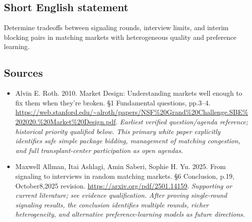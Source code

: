 \documentclass[11pt]{article}
\begin{document}
\subsection{Short English statement}
Determine tradeoffs between signaling rounds, interview limits, and interim blocking pairs in matching markets with heterogeneous quality and preference learning.

\subsection{Sources}
\begin{itemize}\raggedright
\item[\textnormal{[S1]}]\hypertarget{source:30007579:1}{} Alvin E. Roth. 2010. Market Design: Understanding markets well enough to fix them when they’re broken. §1 Fundamental questions, pp.3–4.
\url{https://web.stanford.edu/~alroth/papers/NSF%20Grand%20Challenge.SBE%202020.%20Market%20Design.pdf}.
{\small\textit{Earliest verified question/agenda reference; historical priority qualified below. This primary white paper explicitly identifies safe simple package bidding, management of matching congestion, and full transplant-center participation as open agendas.}}

\item[\textnormal{[S2]}]\hypertarget{source:30007579:2}{} Maxwell Allman, Itai Ashlagi, Amin Saberi, Sophie H. Yu. 2025. From signaling to interviews in random matching markets. §6 Conclusion, p.19, October8,2025 revision.
\url{https://arxiv.org/pdf/2501.14159}.
{\small\textit{Supporting or current literature; see evidence qualification. After proving single-round signaling results, the conclusion identifies multiple rounds, richer heterogeneity, and alternative preference-learning models as future directions.}}
\end{itemize}
\end{document}
